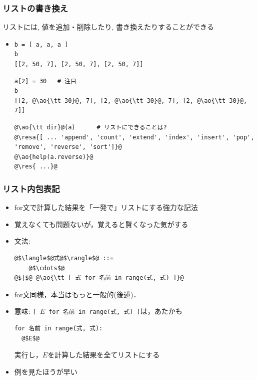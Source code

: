 \documentclass[10pt,dvipdfmx]{beamer}
\newcommand{\ore}[1]{{\color{orange}#1}}
\newcommand{\ao}[1]{{\color{blue}#1}}
\newcommand{\resa}[1]{\ore{\textsl{$\rightarrow$ #1}}}
\newcommand{\res}[1]{\ore{\textsl{#1}}}
\begin{document}
\begin{frame}[fragile]
\frametitle{リストの書き換え}
リストには, 値を追加・削除したり, 書き換えたりすることができる
\begin{itemize}
\item []
\begin{lstlisting}
b = [ a, a, a ]
b
[[2, 50, 7], [2, 50, 7], [2, 50, 7]]
\end{lstlisting}
\begin{lstlisting}
a[2] = 30   # 注目
b
[[2, @\ao{\tt 30}@, 7], [2, @\ao{\tt 30}@, 7], [2, @\ao{\tt 30}@, 7]]
\end{lstlisting}
\begin{lstlisting}
@\ao{\tt dir}@(a)      # リストにできることは?
@\resa{[ ... 'append', 'count', 'extend', 'index', 'insert', 'pop', 'remove', 'reverse', 'sort']}@
@\ao{help(a.reverse)}@
@\res{ ...}@
\end{lstlisting}
\end{itemize}
\end{frame}


\begin{frame}[fragile]
\frametitle{リスト内包表記}
\begin{itemize}
\item for文で計算した結果を「一発で」リストにする強力な記法
\item 覚えなくても問題ないが，覚えると賢くなった気がする
\item 文法:
\begin{lstlisting}
@$\langle$@式@$\rangle$@ ::=
    @$\cdots$@
@$|$@ @\ao{\tt [ 式 for 名前 in range(式, 式) ]}@
\end{lstlisting}

\item for文同様，本当はもっと一般的(後述)．

\item 意味: {\tt [ $E$ for 名前 in range(式, 式) ]}は，あたかも
\begin{lstlisting}
for 名前 in range(式, 式): 
  @$E$@
\end{lstlisting}
実行し，$E$を計算した結果を全てリストにする

\item 例を見たほうが早い
\end{itemize}
\end{frame}
\end{document}
